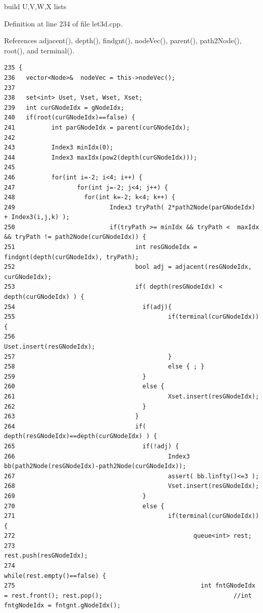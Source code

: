 build U,V,W,X lists 

Definition at line 234 of file let3d.cpp.

References adjacent(), depth(), findgnt(), node\-Vec(), parent(), path2Node(), root(), and terminal().

\footnotesize\begin{verbatim}235 {
236   vector<Node>&  nodeVec = this->nodeVec();
237   
238   set<int> Uset, Vset, Wset, Xset;
239   int curGNodeIdx = gNodeIdx;
240   if(root(curGNodeIdx)==false) {
241          int parGNodeIdx = parent(curGNodeIdx);
242          
243          Index3 minIdx(0);
244          Index3 maxIdx(pow2(depth(curGNodeIdx)));
245 
246          for(int i=-2; i<4; i++) {
247                 for(int j=-2; j<4; j++) {
248                   for(int k=-2; k<4; k++) {
249                          Index3 tryPath( 2*path2Node(parGNodeIdx) + Index3(i,j,k) );
250                          if(tryPath >= minIdx && tryPath <  maxIdx && tryPath != path2Node(curGNodeIdx)) {      
251                                 int resGNodeIdx = findgnt(depth(curGNodeIdx), tryPath);
252                                 bool adj = adjacent(resGNodeIdx, curGNodeIdx);
253                                 if( depth(resGNodeIdx) < depth(curGNodeIdx) ) {
254                                   if(adj){
255                                          if(terminal(curGNodeIdx)){
256                                                 Uset.insert(resGNodeIdx);
257                                          }
258                                          else { ; }
259                                   }
260                                   else {
261                                          Xset.insert(resGNodeIdx);
262                                   }
263                                 }
264                                 if( depth(resGNodeIdx)==depth(curGNodeIdx) ) {
265                                   if(!adj) {
266                                          Index3 bb(path2Node(resGNodeIdx)-path2Node(curGNodeIdx));
267                                          assert( bb.linfty()<=3 );
268                                          Vset.insert(resGNodeIdx);
269                                   }
270                                   else {
271                                          if(terminal(curGNodeIdx)) {
272                                                 queue<int> rest;
273                                                 rest.push(resGNodeIdx);
274                                                 while(rest.empty()==false) {
275                                                   int fntGNodeIdx = rest.front(); rest.pop();                                    //int fntgNodeIdx = fntgnt.gNodeIdx();

\end{verbatim}
